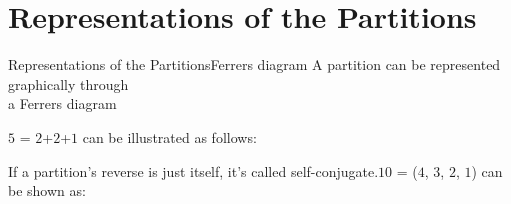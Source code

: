 \documentclass{beamer}
\begin{document}
    \section{Representations of the Partitions}
    \begin{frame}{Representations of the Partitions}{Ferrers diagram}
        \centering
        A partition can be represented graphically through \\ a Ferrers diagram
        \vspace{2em}
    
        \begin{minipage}[t]{0.48\textwidth}
            \centering
           {\tiny {$5$ = $2$+$2$+$1$ can be illustrated as follows:}}
        \end{minipage}\hfill
        \begin{minipage}[t]{0.48\textwidth}
            \centering
            {\tiny{If a partition's reverse is just itself, it's called self-conjugate.$10$ = ($4$, $3$, $2$, $1$) can be shown as: }}
                \vspace{2em}
        \end{minipage}
    \end{frame}
    
\end{document}
